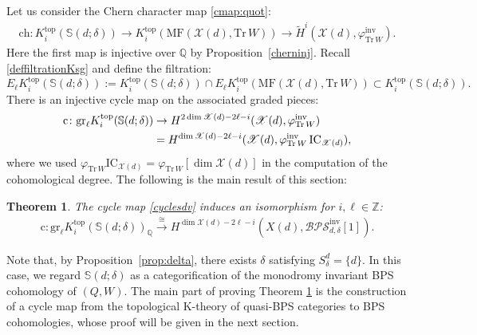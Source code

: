 \documentclass [11pt,oneside,a4paper,mathscr]{amsart}
\newtheorem{thm}{Theorem}[section]
\theoremstyle{definition}
\newcommand{\X}{\mathscr{X}}
\begin{document}
Let us consider the Chern character map \eqref{cmap:quot}:
 \begin{align}\label{chsdv}
 \mathrm{ch}\colon K^{\mathrm{top}}_i(\mathbb{S}(d; \delta))
 \to K^{\mathrm{top}}_i(\mathrm{MF}(\X(d), \mathrm{Tr}\,W))\to \widetilde{H}^i(\X(d), \varphi_{\mathrm{Tr}\,W}^{\mathrm{inv}}).\end{align}
Here the first map is injective over $\mathbb{Q}$
by Proposition~\ref{cherninj}. 
Recall \eqref{deffiltrationKsg} and define the filtration:
\[E_\ell K^{\mathrm{top}}_i(\mathbb{S}(d; \delta)):=K^{\mathrm{top}}_i(\mathbb{S}(d; \delta))\cap E_\ell K^{\mathrm{top}}_i(\mathrm{MF}(\X(d), \mathrm{Tr}\,W))\subset K^{\mathrm{top}}_i(\mathbb{S}(d; \delta)).\]
There is an injective cycle map on the associated graded pieces:
\begin{align}\label{cyclesdv}
    \mathrm{c}\colon \mathrm{gr}_\ell K^{\mathrm{top}}_i(\mathbb{S}(d; \delta))&\to H^{2 \dim\X(d)-2\ell-i}(\X(d), \varphi_{\mathrm{Tr}\,W}^{\mathrm{inv}})\\
    &\notag=
    H^{\dim \X(d)-2\ell-i}(\X(d), \varphi_{\mathrm{Tr}\,W}^{\mathrm{inv}}\,\mathrm{IC}_{\X(d)}),
\end{align}
where we used $\varphi_{\mathrm{Tr}\,W}\mathrm{IC}_{\X(d)}=\varphi_{\mathrm{Tr}\,W}[\dim \X(d)]$ in the computation 
of the cohomological degree.
The following is the main result of this section:

\begin{thm}\label{thm1}
The cycle map \eqref{cyclesdv} induces an isomorphism for $i, \ell\in\mathbb{Z}$:
\begin{align}\label{cyclesdw0}
 \mathrm{c}\colon \mathrm{gr}_\ell K_i^{\mathrm{top}}\left(\mathbb{S}(d; \delta)\right)_{\mathbb{Q}}\xrightarrow{\cong}H^{\dim\X(d)-2\ell-i}(X(d), \mathcal{BPS}_{d, \delta}^{\mathrm{inv}}[1]). 
\end{align}
\end{thm}
Note that, by Proposition~\ref{prop:delta}, there exists $\delta$ satisfying 
$S_{\delta}^d=\{d\}$. 
In this case, 
 we regard $\mathbb{S}(d; \delta)$ as a categorification of the monodromy invariant BPS cohomology of $(Q,W)$. 
The main part of proving Theorem \ref{thm1} is the construction of a cycle map from the topological K-theory of quasi-BPS categories to BPS cohomologies, 
whose proof will be given in the next section.
\end{document}

